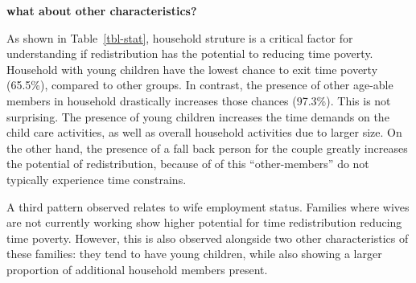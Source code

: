 \documentclass[
  11pt,
]{article}
\begin{document}
\textbf{what about other characteristics?}

As shown in Table~\ref{tbl-stat}, household struture is a critical
factor for understanding if redistribution has the potential to reducing
time poverty. Household with young children have the lowest chance to
exit time poverty (65.5\%), compared to other groups. In contrast, the
presence of other age-able members in household drastically increases
those chances (97.3\%). This is not surprising. The presence of young
children increases the time demands on the child care activities, as
well as overall household activities due to larger size. On the other
hand, the presence of a fall back person for the couple greatly
increases the potential of redistribution, because of of this
``other-members'' do not typically experience time constrains.

A third pattern observed relates to wife employment status. Families
where wives are not currently working show higher potential for time
redistribution reducing time poverty. However, this is also observed
alongside two other characteristics of these families: they tend to have
young children, while also showing a larger proportion of additional
household members present.

\begin{table}

\caption{\label{tbl-stat}Summary Statistics Population}


\end{table}%
\end{document}
